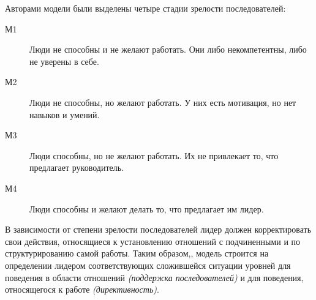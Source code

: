 \documentclass[a4paper,12pt,oneside,final]{extarticle}
\numberwithin{equation}{section}
\begin{document}
Авторами модели были выделены четыре стадии зрелости последователей:
\begin{description}
	\item[М1] Люди не способны и не желают работать. 
	Они либо некомпетентны, либо не уверены в себе.
	\item[М2] Люди не способны, но желают работать. 
	У них есть мотивация, но нет навыков и умений.
	\item[М3] Люди способны, но не желают работать. 
	Их не привлекает то, что предлагает руководитель.
	\item[М4] Люди способны и желают делать то, что предлагает им лидер.
\end{description}

В зависимости от степени зрелости последователей лидер должен корректировать свои действия, относящиеся к установлению отношений с подчиненными и по структурированию самой работы. 
Таким образом,, модель строится на определении лидером соответствующих сложившейся ситуации уровней для поведения в области отношений \textit{(поддержка последователей)} и для поведения, относящегося к работе \textit{(директивность)}.
\end{document}
